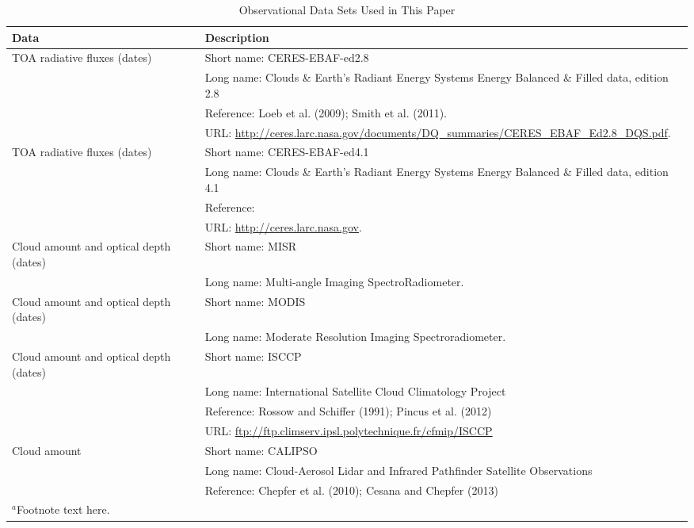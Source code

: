 \documentclass[draft]{agujournal2019}
\begin{document}
 \begin{sidewaystable}
 \caption{ Observational Data Sets Used in This Paper}
 \centering
 \begin{tabular}{l l}
 \hline
 Data  & Description  \\
 \hline
   TOA radiative fluxes (dates)  & Short name: CERES-EBAF-ed2.8   \\
                                     & Long name: Clouds \& Earth's Radiant Energy Systems Energy Balanced \& Filled data, edition 2.8  \\
                                     & Reference: Loeb et al. (2009); Smith et al. (2011).  \\
                                     & URL: \url{http://ceres.larc.nasa.gov/documents/DQ_summaries/CERES_EBAF_Ed2.8_DQS.pdf}.   \\
   TOA radiative fluxes (dates)  & Short name: CERES-EBAF-ed4.1   \\
                                     & Long name: Clouds \& Earth's Radiant Energy Systems Energy Balanced \& Filled data, edition 4.1  \\
                                     & Reference:   \\
                                     & URL: \url{http://ceres.larc.nasa.gov}.   \\
   Cloud amount and optical depth (dates) & Short name:  MISR   \\
                                                                   &  Long name: Multi-angle Imaging SpectroRadiometer.  \\
   Cloud amount and optical depth (dates)  & Short name: MODIS  \\
                                                                   & Long name: Moderate Resolution Imaging Spectroradiometer.  \\
   Cloud amount and optical depth (dates)  & Short name: ISCCP   \\
                                                                   & Long name: International Satellite Cloud Climatology Project   \\
                                                                   & Reference: Rossow and Schiffer (1991); Pincus et al. (2012)   \\
                                                                   & URL: \url{ftp://ftp.climserv.ipsl.polytechnique.fr/cfmip/ISCCP}     \\
   Cloud amount  & Short name: CALIPSO   \\
                           & Long name: Cloud-Aerosol Lidar and Infrared Pathfinder Satellite Observations   \\
                           & Reference: Chepfer et al. (2010); Cesana and Chepfer (2013)      \\
    \hline
 \multicolumn{2}{l}{$^{a}$Footnote text here.}
 \end{tabular}
 \end{sidewaystable}
 
\end{document}
